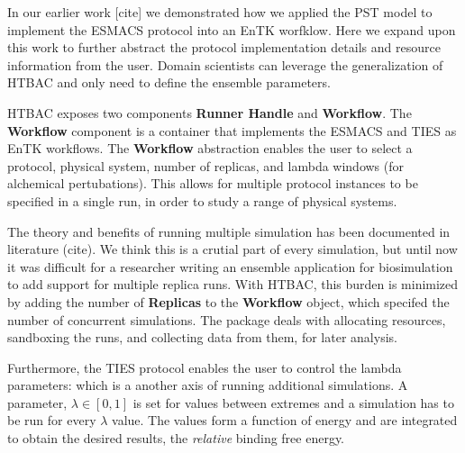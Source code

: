 In our earlier work [cite] we demonstrated how we applied the PST model to
implement the ESMACS protocol into an EnTK worfklow. Here we expand upon this
work to further abstract the protocol implementation details and resource
information from the user. Domain scientists can leverage the generalization
of HTBAC and only need to define the ensemble parameters.

HTBAC exposes two components \textbf{Runner Handle} and \textbf{Workflow}.
 The \textbf{Workflow} component is a
container that implements the ESMACS and TIES as EnTK workflows.  The
\textbf{Workflow} abstraction enables the user to select a protocol, physical
system, number of replicas, and lambda windows (for alchemical pertubations).
This allows for multiple protocol instances to be specified in a single run,
in order to study a range of physical systems. 

The theory and benefits of running multiple simulation has been documented in
literature (cite). We think this  is a crutial part
of every simulation, but until now it was difficult for a researcher writing
an ensemble application for biosimulation to add support for multiple replica
runs.  With HTBAC,
this burden is minimized by adding the number of \textbf{Replicas} to the
\textbf{Workflow} object, which specifed the number of concurrent simulations.
The package deals with allocating resources, sandboxing the runs, and
collecting data from them, for later analysis. 

 Furthermore, the TIES protocol enables the user to control the
lambda parameters: which is a another axis of running additional simulations.
A parameter, $\lambda \in [0, 1]$ is set for values between extremes and a
simulation has to be run for every $\lambda$ value. The values form a function
of energy and are integrated to obtain the desired results, the
\emph{relative} binding free energy.


